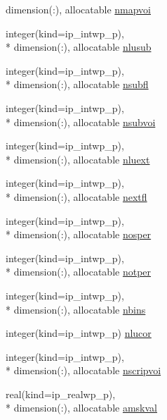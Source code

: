 \begin{DoxyCompactItemize}
dimension(\+:), allocatable \hyperlink{classmod__oasis__namcouple_adb1f8ce6bf94f488c10ef36b3afb8eca}{nmapvoi}
\item 
integer(kind=ip\+\_\+intwp\+\_\+p), \\*
dimension(\+:), allocatable \hyperlink{classmod__oasis__namcouple_aefed5eaa9924d249e979a5a772a46979}{nlusub}
\item 
integer(kind=ip\+\_\+intwp\+\_\+p), \\*
dimension(\+:), allocatable \hyperlink{classmod__oasis__namcouple_a6a94577996b440c31cac5b7d39e7f47a}{nsubfl}
\item 
integer(kind=ip\+\_\+intwp\+\_\+p), \\*
dimension(\+:), allocatable \hyperlink{classmod__oasis__namcouple_a0f31605257bfe125aafb6488a5065d4d}{nsubvoi}
\item 
integer(kind=ip\+\_\+intwp\+\_\+p), \\*
dimension(\+:), allocatable \hyperlink{classmod__oasis__namcouple_a7510ecfe3d0f141252450e4ba66209ba}{nluext}
\item 
integer(kind=ip\+\_\+intwp\+\_\+p), \\*
dimension(\+:), allocatable \hyperlink{classmod__oasis__namcouple_a8302411d5a02efd9a6dc7f784fbb0d4d}{nextfl}
\item 
integer(kind=ip\+\_\+intwp\+\_\+p), \\*
dimension(\+:), allocatable \hyperlink{classmod__oasis__namcouple_a484a71c213c89416924a0e23cfd46269}{nosper}
\item 
integer(kind=ip\+\_\+intwp\+\_\+p), \\*
dimension(\+:), allocatable \hyperlink{classmod__oasis__namcouple_ac154fc90756832bc90d02ea21f7c7e17}{notper}
\item 
integer(kind=ip\+\_\+intwp\+\_\+p), \\*
dimension(\+:), allocatable \hyperlink{classmod__oasis__namcouple_a4c609c48a20205e1d2aa9938d7babc92}{nbins}
\item 
integer(kind=ip\+\_\+intwp\+\_\+p) \hyperlink{classmod__oasis__namcouple_aee9f6849ec644ee40f465976bc6c7b96}{nlucor}
\item 
integer(kind=ip\+\_\+intwp\+\_\+p), \\*
dimension(\+:), allocatable \hyperlink{classmod__oasis__namcouple_abb6f67bfba2cba424dabee3a465fdfd5}{nscripvoi}
\item 
real(kind=ip\+\_\+realwp\+\_\+p), \\*
dimension(\+:), allocatable \hyperlink{classmod__oasis__namcouple_a92d43fa5eaaff81f0e3f73b303377c02}{amskval}

\end{DoxyCompactItemize}
